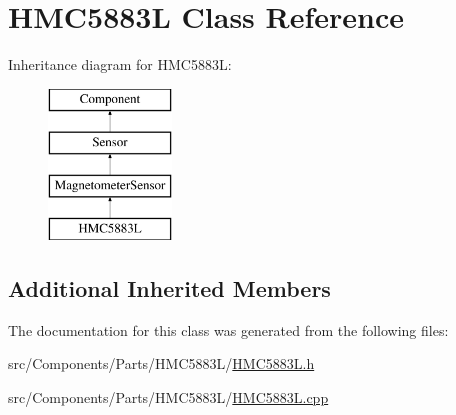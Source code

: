 \hypertarget{classHMC5883L}{}\section{H\+M\+C5883\+L Class Reference}
\label{classHMC5883L}
Inheritance diagram for H\+M\+C5883\+L\+:\begin{figure}[H]
\begin{center}
\leavevmode
\includegraphics[height=4.000000cm]{classHMC5883L}
\end{center}
\end{figure}
\subsection*{Additional Inherited Members}


The documentation for this class was generated from the following files\+:\begin{DoxyCompactItemize}
\item 
src/\+Components/\+Parts/\+H\+M\+C5883\+L/\hyperlink{HMC5883L_8h}{H\+M\+C5883\+L.\+h}\item 
src/\+Components/\+Parts/\+H\+M\+C5883\+L/\hyperlink{HMC5883L_8cpp}{H\+M\+C5883\+L.\+cpp}\end{DoxyCompactItemize}
